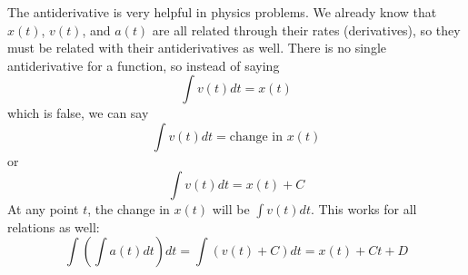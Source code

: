 \documentclass[../revisedmain.tex]{subfiles}
\begin{document}
The antiderivative is very helpful in physics problems. We already know that $x(t)$, $v(t)$, and $a(t)$ are all related through their rates (derivatives), so they must be related with their antiderivatives as well. There is no single antiderivative for a function, so instead of saying $$\int v(t) dt=x(t)$$ which is false, we can say$$\int v(t)dt=\text{change in }x(t)$$or$$\int v(t)dt=x(t)+C$$At any point $t$, the change in $x(t)$ will be $\int v(t) dt$. This works for all relations as well:$$\int\left(\int a(t) dt\right)dt=\int (v(t)+C)dt=x(t)+Ct+D$$
\end{document}
